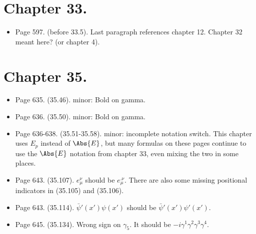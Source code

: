 \section{Chapter 33.}

\begin{itemize}
\item Page 597.  (before 33.5).  Last paragraph references chapter 12.  Chapter 32 meant here?  (or chapter 4).
\end{itemize}

\section{Chapter 35.}

\begin{itemize}
\item Page 635.  (35.46).  minor: Bold on gamma. 
\item Page 636.  (35.50).  minor: Bold on gamma. 
\item Page 636-638.  (35.51-35.58).  minor: incomplete notation switch.  This chapter uses $E_p$ instead of $\Abs{E}$, but many formulas on these pages continue to use the $\Abs{E}$ notation from chapter 33, even mixing the two in some places.
\item Page 643.  (35.107).  $e_\mu^{\nu}$ should be $e_\mu^{.\nu}$.  There are also some missing positional indicators in (35.105) and (35.106).
\item Page 643.  (35.114).  $\bar{\psi}'(x')\psi(x')$ should be $\bar{\psi}'(x')\psi'(x')$.
\item Page 645.  (35.134).  Wrong sign on $\gamma_5$.  It should be $-i \gamma^1 \gamma^2 \gamma^3 \gamma^4$.
\end{itemize}

